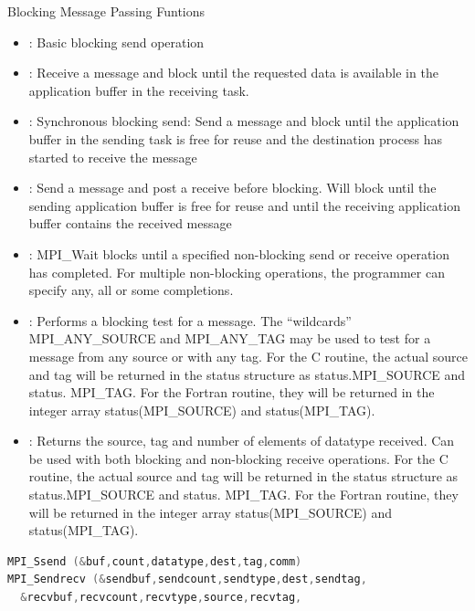 \documentclass[10pt,t]{beamer}
\begin{document}
\begin{frame}{Blocking Message Passing Funtions}
  \begin{itemize}
    \item {}: Basic blocking send operation
    \item {}: Receive a message and block until the requested data is available in the application buffer in the receiving task.
    \item {}: Synchronous blocking send: Send a message and block until the application buffer in the sending task is free for reuse and the destination process has started to receive the message
    \item {}: Send a message and post a receive before blocking. Will block until the sending application buffer is free for reuse and until the receiving application buffer contains the received message
    \item {}: MPI\_Wait blocks until a specified non-blocking send or receive operation has completed. For multiple non-blocking operations, the programmer can specify any, all or some completions.
    \item {}: Performs a blocking test for a message. The “wildcards” MPI\_ANY\_SOURCE and MPI\_ANY\_TAG may be used to test for a message from any source or with any tag. For the C routine, the actual source and tag will be returned in the status structure as status.MPI\_SOURCE and status. MPI\_TAG. For the Fortran routine, they will be returned in the integer array status(MPI\_SOURCE) and status(MPI\_TAG).
    \item {}: Returns the source, tag and number of elements of datatype received. Can be used with both blocking and non-blocking receive operations. For the C routine, the actual source and tag will be returned in the status structure as status.MPI\_SOURCE and status. MPI\_TAG. For the Fortran routine, they will be returned in the integer array status(MPI\_SOURCE) and status(MPI\_TAG).
  \end{itemize}
  \framebreak
  \vspace{-0.5cm}
  \begin{block}{}
  \begin{lstlisting}[basicstyle=\fontsize{5}{7}\ttfamily,language=C]
MPI_Ssend (&buf,count,datatype,dest,tag,comm)
MPI_Sendrecv (&sendbuf,sendcount,sendtype,dest,sendtag,
  &recvbuf,recvcount,recvtype,source,recvtag,

\end{lstlisting}
\end{block}
\end{frame}
\end{document}
